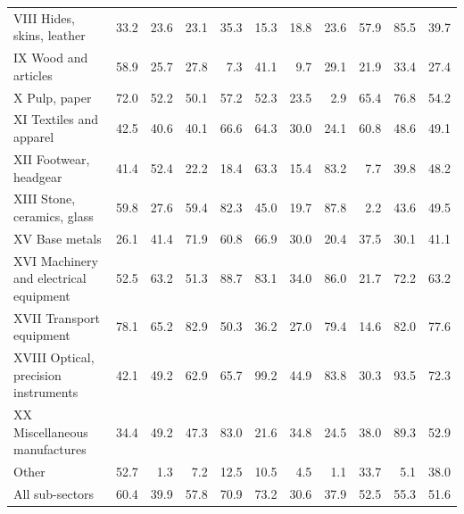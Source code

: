 \begin{tabular}{lrrrrrrrrrr}
VIII Hides, skins, leather & 33.2 & 23.6 & 23.1 & 35.3 & 15.3 & 18.8 & 23.6 & 57.9 & 85.5 & 39.7 \\
IX Wood and articles & 58.9 & 25.7 & 27.8 & 7.3 & 41.1 & 9.7 & 29.1 & 21.9 & 33.4 & 27.4 \\
X Pulp, paper & 72.0 & 52.2 & 50.1 & 57.2 & 52.3 & 23.5 & 2.9 & 65.4 & 76.8 & 54.2 \\
XI Textiles and apparel & 42.5 & 40.6 & 40.1 & 66.6 & 64.3 & 30.0 & 24.1 & 60.8 & 48.6 & 49.1 \\
XII Footwear, headgear & 41.4 & 52.4 & 22.2 & 18.4 & 63.3 & 15.4 & 83.2 & 7.7 & 39.8 & 48.2 \\
XIII Stone, ceramics, glass & 59.8 & 27.6 & 59.4 & 82.3 & 45.0 & 19.7 & 87.8 & 2.2 & 43.6 & 49.5 \\
XV Base metals & 26.1 & 41.4 & 71.9 & 60.8 & 66.9 & 30.0 & 20.4 & 37.5 & 30.1 & 41.1 \\
XVI Machinery and electrical equipment & 52.5 & 63.2 & 51.3 & 88.7 & 83.1 & 34.0 & 86.0 & 21.7 & 72.2 & 63.2 \\
XVII Transport equipment & 78.1 & 65.2 & 82.9 & 50.3 & 36.2 & 27.0 & 79.4 & 14.6 & 82.0 & 77.6 \\
XVIII Optical, precision instruments & 42.1 & 49.2 & 62.9 & 65.7 & 99.2 & 44.9 & 83.8 & 30.3 & 93.5 & 72.3 \\
XX Miscellaneous manufactures & 34.4 & 49.2 & 47.3 & 83.0 & 21.6 & 34.8 & 24.5 & 38.0 & 89.3 & 52.9 \\
Other & 52.7 & 1.3 & 7.2 & 12.5 & 10.5 & 4.5 & 1.1 & 33.7 & 5.1 & 38.0 \\
All sub-sectors & 60.4 & 39.9 & 57.8 & 70.9 & 73.2 & 30.6 & 37.9 & 52.5 & 55.3 & 51.6 \\
\bottomrule
\end{tabular}
